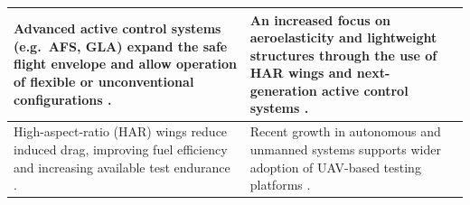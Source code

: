 \begin{longtable}{|p{}|p{}|}
Advanced active control systems (e.g.\ AFS, GLA) expand the safe flight envelope and allow operation of flexible or unconventional configurations \cite{Abramov2014}.
&
An increased focus on aeroelasticity and lightweight structures through the use of HAR wings and next-generation active control systems \cite{Castro2026}.
\\ \hline

\rowcolor[HTML]{ECF4FF}
High-aspect-ratio (HAR) wings reduce induced drag, improving fuel efficiency and increasing available test endurance \cite{Castro2026}.
&
Recent growth in autonomous and unmanned systems supports wider adoption of UAV-based testing platforms \cite{Telli2023}.
\\ \hline

\end{longtable}




